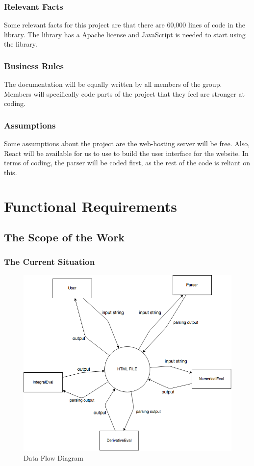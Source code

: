 \documentclass[11pt, oneside]{article}
\begin{document}
\subsubsection{Relevant Facts}
Some relevant facts for this project are that there are 60,000 lines of code in the library. The library has a Apache license and JavaScript is needed to start using the library.

\subsubsection{Business Rules}
The documentation will be equally written by all members of the group. Members will specifically code parts of the project that they feel are stronger at coding.

\subsubsection{Assumptions}
Some assumptions about the project are the web-hosting server will be free. Also, React will be available for us to use to build the user interface for the website. In terms of coding, the parser will be coded first, as the rest of the code is reliant on this.


\newpage
\section{Functional Requirements}
\subsection{The Scope of the Work}
\subsubsection{The Current Situation}
\begin{figure}[H] %
   \centering
   \includegraphics[width=6in]{DataFlowDiagram.png}
   \caption{Data Flow Diagram}
   \label{fig:example}
\end{figure}
\end{document}
